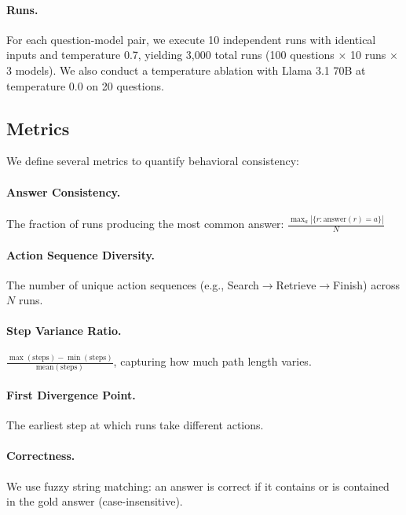 \documentclass{article}
\begin{document}
\paragraph{Runs.} For each question-model pair, we execute 10 independent runs with identical inputs and temperature 0.7, yielding 3,000 total runs (100 questions $\times$ 10 runs $\times$ 3 models). We also conduct a temperature ablation with Llama 3.1 70B at temperature 0.0 on 20 questions.

\subsection{Metrics}

We define several metrics to quantify behavioral consistency:

\paragraph{Answer Consistency.} The fraction of runs producing the most common answer: $\frac{\max_a |\{r : \text{answer}(r) = a\}|}{N}$

\paragraph{Action Sequence Diversity.} The number of unique action sequences (e.g., Search$\rightarrow$Retrieve$\rightarrow$Finish) across $N$ runs.

\paragraph{Step Variance Ratio.} $\frac{\max(\text{steps}) - \min(\text{steps})}{\text{mean}(\text{steps})}$, capturing how much path length varies.

\paragraph{First Divergence Point.} The earliest step at which runs take different actions.

\paragraph{Correctness.} We use fuzzy string matching: an answer is correct if it contains or is contained in the gold answer (case-insensitive).

\end{document}
